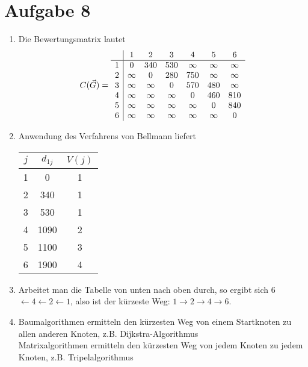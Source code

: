 \documentclass{article}
\begin{document}
	\section*{Aufgabe 8}
	\begin{enumerate}[label=(\alph*)]
		\item Die Bewertungsmatrix lautet
		\begin{align}
			C(\vec{G}) = \begin{array}{c|cccccc}
			& 1 & 2 & 3 & 4 & 5 & 6 \\
			\hline
			1 & 0 & 340 & 530 & \infty & \infty & \infty \\
			2 & \infty & 0 & 280 & 750 & \infty & \infty \\
			3 & \infty & \infty & 0 & 570 & 480 & \infty \\
			4 & \infty & \infty & \infty & 0 & 460 & 810 \\
			5 & \infty & \infty & \infty & \infty & 0 & 840 \\
			6 & \infty & \infty & \infty & \infty & \infty & 0
			\end{array} \notag
		\end{align}
		\item Anwendung des Verfahrens von Bellmann liefert
		\begin{center}
			\begin{tabular}{c|c|c}
				$j$ & $d_{1j}$ & $V(j)$ \\
				\hline
				1 & 0 & 1 \\
				2 & 340 & 1 \\
				3 & 530 & 1 \\
				4 & 1090 & 2 \\
				5 & 1100 & 3 \\
				6 & 1900 & 4
			\end{tabular}
		\end{center}
		\item Arbeitet man die Tabelle von unten nach oben durch, so ergibt sich 6 $\leftarrow 4 \leftarrow 2 \leftarrow 1$, also ist der kürzeste Weg: $1 \to 2 \to 4 \to 6$.
		\item Baumalgorithmen ermitteln den kürzesten Weg von einem Startknoten zu allen anderen Knoten, z.B. Dijkstra-Algorithmus \\
		Matrixalgorithmen ermitteln den kürzesten Weg von jedem Knoten zu jedem Knoten, z.B. Tripelalgorithmus
	\end{enumerate}
\end{document}
